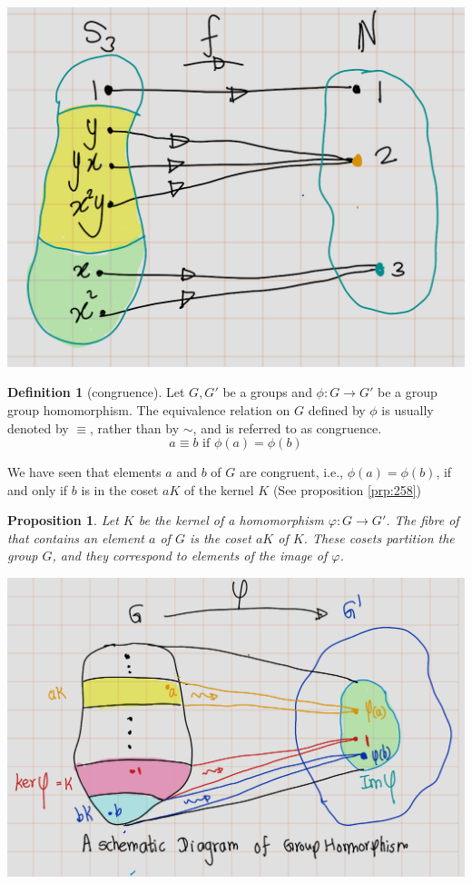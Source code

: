\documentclass[
]{book}
\newtheorem{proposition}{Proposition}[chapter]
\theoremstyle{definition}
\newtheorem{definition}{Definition}[chapter]
\theoremstyle{definition}
\theoremstyle{definition}
\theoremstyle{definition}
\theoremstyle{remark}
\begin{document}
\includegraphics{figures/ch_2/fig34.png}

\begin{definition}[congruence]
\protect\hypertarget{def:unnamed-chunk-35}{}\label{def:unnamed-chunk-35}Let \(G,G'\) be a groups and \(\phi: G \rightarrow G'\) be a group group homomorphism. The equivalence relation on \(G\) defined by \(\phi\) is usually denoted by \(\equiv\), rather than by \(\sim\), and is referred to as congruence.
\[a \equiv b \text{ if }\phi(a) = \phi(b)\]
\end{definition}

We have seen that elements \(a\) and \(b\) of \(G\) are congruent, i.e., \(\phi(a) = \phi(b)\), if and only if \(b\) is
in the coset \(a K\) of the kernel \(K\) (See proposition \ref{prp:258})

\begin{proposition}
\protect\hypertarget{prp:unnamed-chunk-36}{}\label{prp:unnamed-chunk-36}Let \(K\) be the kernel of a homomorphism \(\varphi: G \to G'\). The fibre of that contains an element \(a\) of \(G\) is the coset \(a K\) of \(K\). These cosets partition the group \(G\), and they correspond to elements of the image of \(\varphi\).
\end{proposition}

\includegraphics{figures/ch_2/fig35.png}
\end{document}
